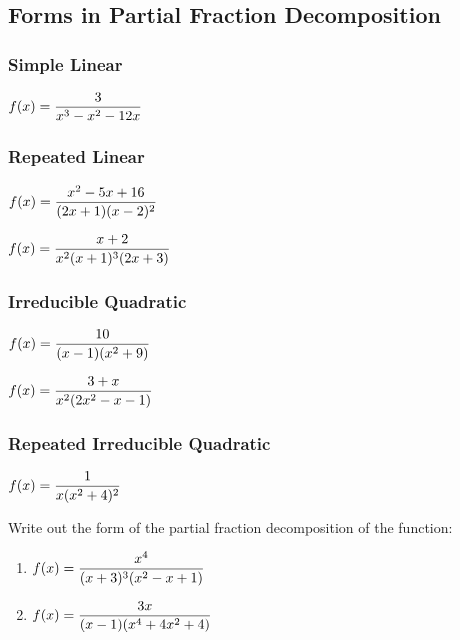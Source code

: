 \documentclass[12pt]{article}
\begin{document}
\newpage

\subsection*{Forms in Partial Fraction Decomposition}

\subsubsection*{ Simple Linear}
\Example $f(x)=\displaystyle\frac{3}{x^3-x^2-12x}$

\vfill

\subsubsection*{ Repeated Linear}
\Example $f(x)=\displaystyle\frac{x^2-5x+16}{(2x+1)(x-2)^2}$

\vfill

\Example $f(x)=\displaystyle\frac{x+2}{x^2(x+1)^3(2x+3)}$

\vfill

\subsubsection*{ Irreducible Quadratic}
\Example $f(x)=\displaystyle\frac{10}{(x-1)(x^2+9)}$

\vfill

\newpage


\Example $f(x)=\displaystyle\frac{3+x}{x^2(2x^2-x-1)}$

\vfill

\subsubsection*{ Repeated Irreducible Quadratic}
\Example $f(x)=\displaystyle\frac{1}{x(x^2+4)^2}$

\vfill

\Example Write out the form of the partial fraction decomposition of the function:
\begin{enumerate}
\item $f(x)=\displaystyle\frac{x^4}{(x+3)^3(x^2-x+1)}$

\vspace{20mm}

\item $f(x)=\displaystyle\frac{3x}{(x-1)(x^4+4x^2+4)}$

\vspace{20mm}

\end{enumerate}
\end{document}
